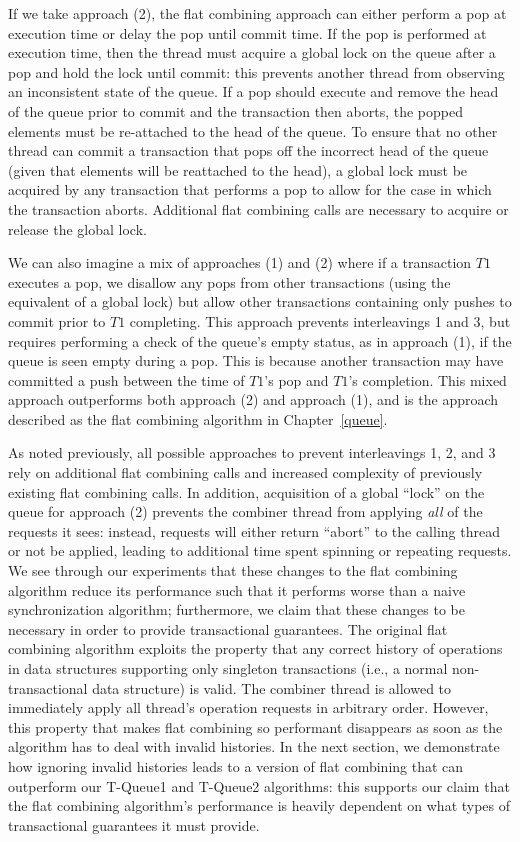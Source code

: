 If we take approach (2), the flat combining approach can either perform a pop at execution time or delay the pop until commit time. If the pop is performed at execution time, then the thread must acquire a global lock on the queue after a pop and hold the lock until commit: this prevents another thread from observing an inconsistent state of the queue. If a pop should execute and remove the head of the queue prior to commit and the transaction then aborts, the popped elements must be re-attached to the head of the queue. To ensure that no other thread can commit a transaction that pops off the incorrect head of the queue (given that elements will be reattached to the head), a global lock must be acquired by any transaction that performs a pop to allow for the case in which the transaction aborts. Additional flat combining calls are necessary to acquire or release the global lock. 

We can also imagine a mix of approaches (1) and (2) where if a transaction $T1$ executes a pop, we disallow any pops from other transactions (using the equivalent of a global lock) but allow other transactions containing only pushes to commit prior to $T1$ completing. This approach prevents interleavings 1 and 3, but requires performing a check of the queue's empty status, as in approach (1), if the queue is seen empty during a pop. This is because another transaction may have committed a push between the time of $T1$'s pop and $T1$'s completion. This mixed approach outperforms both approach (2) and approach (1), and is the approach described as the flat combining algorithm in Chapter~\ref{queue}. 

As noted previously, all possible approaches to prevent interleavings 1, 2, and 3 rely on additional flat combining calls and increased complexity of previously existing flat combining calls. In addition, acquisition of a global ``lock'' on the queue for approach (2) prevents the combiner thread from applying \emph{all} of the requests it sees: instead, requests will either return ``abort'' to the calling thread or not be applied, leading to additional time spent spinning or repeating requests. We see through our experiments that these changes to the flat combining algorithm reduce its performance such that it performs worse than a naive synchronization algorithm; furthermore, we claim that these changes to be necessary in order to provide transactional guarantees. The original flat combining algorithm exploits the property that any correct history of operations in data structures supporting only singleton transactions (i.e., a normal non-transactional data structure) is valid. The combiner thread is allowed to immediately apply all thread's operation requests in arbitrary order. However, this property that makes flat combining so performant disappears as soon as the algorithm has to deal with invalid histories. In the next section, we demonstrate how ignoring invalid histories leads to a version of flat combining that can outperform our T-Queue1 and T-Queue2 algorithms: this supports our claim that the flat combining algorithm's performance is heavily dependent on what types of transactional guarantees it must provide.
